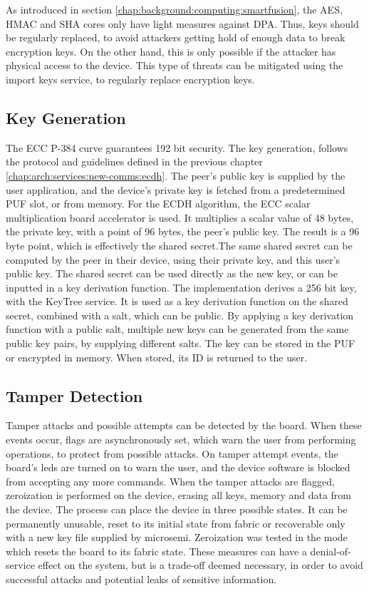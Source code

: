 As introduced in section \ref{chap:background:computing:smartfusion}, the AES, HMAC and SHA cores only have light measures against \ac{DPA}. Thus, keys should be regularly replaced, to avoid attackers getting hold of enough data to break encryption keys. On the other hand, this is only possible if the attacker has physical access to the device. 
This type of threats can be mitigated using the import keys service, to regularly replace encryption keys.

\subsection{Key Generation}\label{chap:implementation:services:key-generation}

The \ac{ECC} P-384 curve guarantees 192 bit security.
The key generation, follows the protocol and guidelines defined in the previous chapter \ref{chap:arch:services:new-comms:ecdh}.
The peer's public key is supplied by the user application, and the device's private key is fetched from a predetermined PUF slot, or from memory.
For the ECDH algorithm, the ECC scalar multiplication board accelerator is used. It multiplies a scalar value of 48 bytes, the private key, with a point of 96 bytes, the peer's public key. The result is a 96 byte point, which is effectively the shared secret.The same shared secret can be computed by the peer in their device, using their private key, and this user's public key.
The shared secret can be used directly as the new key, or can be inputted in a key derivation function.
The implementation derives a 256 bit key, with the KeyTree service. It is used as a key derivation function on the shared secret, combined with a salt, which can be public.
By applying a key derivation function with a public salt, multiple new keys can be generated from the same public key pairs, by supplying different salts. 
The key can be stored in the PUF or encrypted in memory. When stored, its ID is returned to the user.

\subsection{Tamper Detection}\label{chap:implementation:services:tamper-detection}

Tamper attacks and possible attempts can be detected by the board. When these events occur, flags are asynchronously set, which warn the user from performing operations, to protect from possible attacks.
On tamper attempt events, the board's leds are turned on to warn the user, and the device software is blocked from accepting any more commands.
When the tamper attacks are flagged, zeroization is performed on the device, erasing all keys, memory and data from the device.
The process can place the device in three possible states. It can be permanently unusable, reset to its initial state from fabric or recoverable only with a new key file supplied by microsemi. Zeroization was tested in the mode which resets the board to its fabric state.
These measures can have a denial-of-service effect on the system, but is a trade-off deemed necessary, in order to avoid successful attacks and potential leaks of sensitive information.

